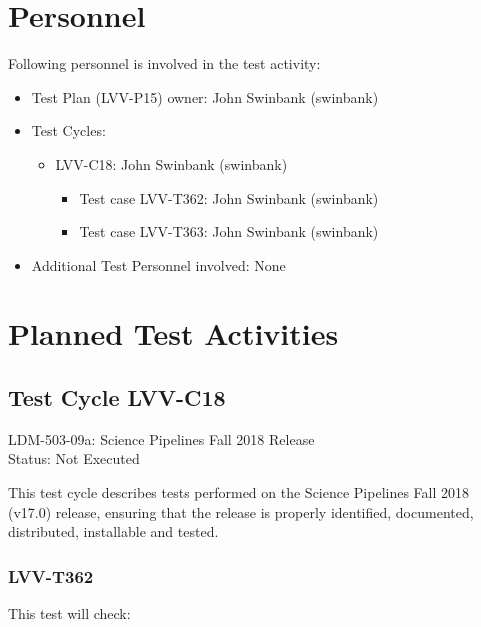 \documentclass[DM,lsstdraft,STR,toc]{lsstdoc}
\begin{document}
\section{Personnel}
\label{sect:personnel}

Following personnel is involved in the test activity:

\begin{itemize}
\item Test Plan (LVV-P15) owner: John Swinbank (swinbank)
\item Test Cycles:
\begin{itemize}
  \item LVV-C18: John Swinbank (swinbank)
  \begin{itemize}
    \item Test case LVV-T362: John Swinbank (swinbank)
    \item Test case LVV-T363: John Swinbank (swinbank)
  \end{itemize}
\end{itemize}
\item Additional Test Personnel involved: None
\end{itemize}

\newpage
\section{Planned Test Activities}
\label{sect:plannedtestactivities}


\subsection{Test Cycle LVV-C18}

LDM-503-09a: Science Pipelines Fall 2018 Release\\
Status: Not Executed


This test cycle describes tests performed on the Science Pipelines Fall
2018 (v17.0) release, ensuring that the release is properly identified,
documented, distributed, installable and tested.



\subsubsection{LVV-T362}

This test will check:
\end{document}
